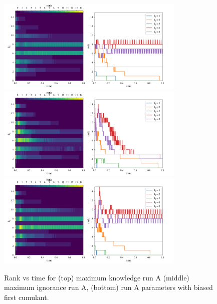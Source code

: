 \documentclass{jfm}
\begin{document}
\begin{figure}
    \centering
    \includegraphics[width=0.8\textwidth]{figs/rank_vs_t_run_A_max_knowl.pdf}\\
    \includegraphics[width=0.8\textwidth]{figs/rank_vs_t_run_A_DSS_max_ig.pdf}\\
    \includegraphics[width=0.8\textwidth]{figs/rank_vs_t_run_I.pdf}\\
    \caption{Rank vs time for (top) maximum knowledge run A (middle) maximum ignorance run A, (bottom) run A parameters with biased first cumulant.}
    \label{fig:rank_run_A_max_knowl}
\end{figure}

\end{document}
